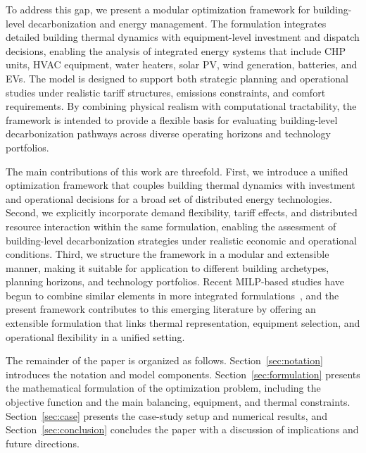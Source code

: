 \documentclass[11pt]{article}
\begin{document}
To address this gap, we present a modular optimization framework for building-level decarbonization and energy management. The formulation integrates detailed building thermal dynamics with equipment-level investment and dispatch decisions, enabling the analysis of integrated energy systems that include CHP units, HVAC equipment, water heaters, solar PV, wind generation, batteries, and EVs. The model is designed to support both strategic planning and operational studies under realistic tariff structures, emissions constraints, and comfort requirements. By combining physical realism with computational tractability, the framework is intended to provide a flexible basis for evaluating building-level decarbonization pathways across diverse operating horizons and technology portfolios.

The main contributions of this work are threefold. First, we introduce a unified optimization framework that couples building thermal dynamics with investment and operational decisions for a broad set of distributed energy technologies. Second, we explicitly incorporate demand flexibility, tariff effects, and distributed resource interaction within the same formulation, enabling the assessment of building-level decarbonization strategies under realistic economic and operational conditions. Third, we structure the framework in a modular and extensible manner, making it suitable for application to different building archetypes, planning horizons, and technology portfolios. Recent MILP-based studies have begun to combine similar elements in more integrated formulations~\cite{aziz2025integrated,liu2025comparative,wu2025mitigating,zhang2024optimal}, and the present framework contributes to this emerging literature by offering an extensible formulation that links thermal representation, equipment selection, and operational flexibility in a unified setting.

The remainder of the paper is organized as follows. Section~\ref{sec:notation} introduces the notation and model components. Section~\ref{sec:formulation} presents the mathematical formulation of the optimization problem, including the objective function and the main balancing, equipment, and thermal constraints. Section~\ref{sec:case} presents the case-study setup and numerical results, and Section~\ref{sec:conclusion} concludes the paper with a discussion of implications and future directions.
\end{document}
